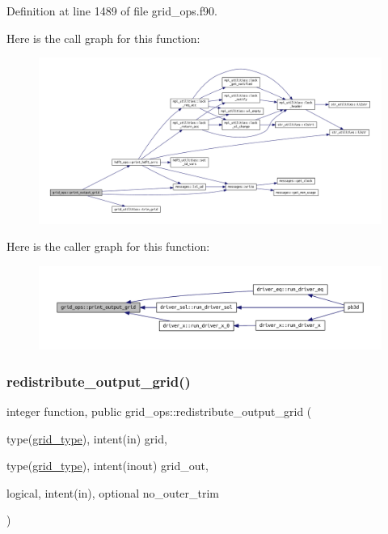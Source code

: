 Definition at line 1489 of file grid\+\_\+ops.\+f90.

Here is the call graph for this function\+:\nopagebreak
\begin{figure}[H]
\begin{center}
\leavevmode
\includegraphics[width=350pt]{namespacegrid__ops_a4827e794d37334c0cad9bb2016e64d46_cgraph}
\end{center}
\end{figure}
Here is the caller graph for this function\+:\nopagebreak
\begin{figure}[H]
\begin{center}
\leavevmode
\includegraphics[width=350pt]{namespacegrid__ops_a4827e794d37334c0cad9bb2016e64d46_icgraph}
\end{center}
\end{figure}
\mbox{\label{namespacegrid__ops_ab10ef5b486ee3861df2da4e53bc22630}} 
\subsubsection{\texorpdfstring{redistribute\+\_\+output\+\_\+grid()}{redistribute\_output\_grid()}}
{\footnotesize\ttfamily integer function, public grid\+\_\+ops\+::redistribute\+\_\+output\+\_\+grid (\begin{DoxyParamCaption}\item[{type(\hyperlink{structgrid__vars_1_1grid__type}{grid\+\_\+type}), intent(in)}]{grid,  }\item[{type(\hyperlink{structgrid__vars_1_1grid__type}{grid\+\_\+type}), intent(inout)}]{grid\+\_\+out,  }\item[{logical, intent(in), optional}]{no\+\_\+outer\+\_\+trim }\end{DoxyParamCaption})}



